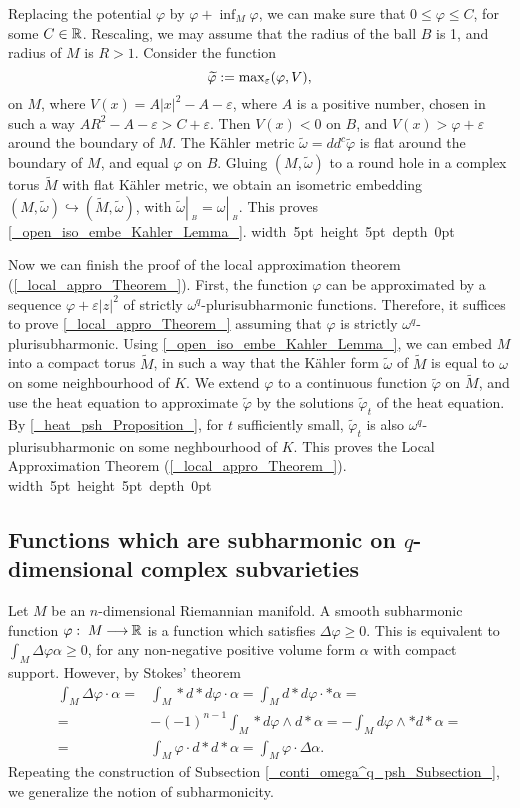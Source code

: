 \documentclass[11pt]{article}
\numberwithin{equation}{section}
\newcommand{\arrow}{{\:\longrightarrow\:}}
\newcommand{\R}{{\Bbb R}}
\newcommand{\6}{\partial}
\newcommand{\restrict}[1]{{\left|_{{\phantom{|}\!\!}_{#1}}\right.}}
\renewcommand{\tilde}{\widetilde}
\renewcommand{\phi}{\varphi}
\renewcommand{\epsilon}{\varepsilon}
\renewcommand{\geq}{\geqslant}
\renewcommand{\leq}{\leqslant}
\renewcommand{\max}{{\rm max}}
\newcounter{theorem}[section]
\def\blacksquare{\hbox{\vrule width 5pt height 5pt depth 0pt}}
\def\endproof{\blacksquare}
\begin{document}
Replacing the potential $\phi$ by $\phi + \inf_M \phi$,
we can make sure that $0 \leq \phi\leq C$, for some $C\in \R$.
Rescaling, we may assume that the radius of the ball $B$
is 1, and radius of $M$ is $R>1$. Consider the function 
\[  \tilde \phi:=
    \max_\epsilon(\phi, V),
\]
on $M$, where $V(x)= A|x|^2 - A -\epsilon$, where $A$
is a positive number, chosen in such a way
$A R^2 - A - \epsilon > C +\epsilon$. Then
$V(x)< 0$ on $B$, and $V(x)> \phi +\epsilon$ around the
boundary of $M$. The K\"ahler metric 
$\tilde\omega = dd^c \tilde \phi$ is flat 
around the boundary of $M$, and equal $\phi$ on $B$. 
Gluing $(M, \tilde \omega)$ to a round hole in a complex
torus $\tilde M$ with flat K\"ahler metric, we obtain
an isometric embedding 
$(M,\tilde \omega) \hookrightarrow (\tilde M, \tilde \omega)$,
with $\tilde \omega\restrict B = \omega\restrict B$.
This proves \ref{_open_iso_embe_Kahler_Lemma_}. \endproof

\hfill

Now we can finish the proof of the local
approximation theorem (\ref{_local_appro_Theorem_}).
First, the function $\phi$ can be approximated by a
sequence $\phi + \epsilon |z|^2$ of strictly
$\omega^q$-plurisubharmonic functions. Therefore,
it suffices to prove \ref{_local_appro_Theorem_}
assuming that $\phi$ is strictly
$\omega^q$-plurisubharmonic.
Using \ref{_open_iso_embe_Kahler_Lemma_},
we can embed $M$ into a compact torus $\tilde M$,
in such a way that the K\"ahler form $\tilde \omega$
of $\tilde M$ is equal to $\omega$ on
some neighbourhood of $K$. We extend $\phi$
to a continuous function $\tilde \phi$ 
on $\tilde M$, and use the heat equation
to approximate $\tilde \phi$ by
the solutions $\tilde \phi_t$ of the
heat equation. By \ref{_heat_psh_Proposition_}, for
$t$ sufficiently small,
$\tilde \phi_t$ is also $\omega^q$-plurisubharmonic
on some neghbourhood of $K$. This proves
the Local Approximation Theorem
(\ref{_local_appro_Theorem_}). \endproof 


\subsection{Functions which are subharmonic on
  $q$-dimensional complex subvarieties}

Let $M$ be an $n$-dimensional Riemannian manifold. A smooth subharmonic
function $\phi:\; M \arrow \R$ is a function which
satisfies $\Delta\phi \geq 0$. This is equivalent to 
$\int_M \Delta\phi \alpha\geq 0$, for any non-negative
positive volume form $\alpha$ with compact support.
However, by Stokes' theorem
\begin{align*}
\int_M \Delta\phi \cdot \alpha=&\int_M *d*d\phi \cdot
\alpha=\int_M d*d\phi \cdot *\alpha=\\ =& -(-1)^{n-1}\int_M
*d\phi \wedge d*\alpha = -\int_M d\phi \wedge *d*\alpha=\\ =& 
\int_M \phi \cdot d*d*\alpha = \int_M \phi \cdot\Delta\alpha.
\end{align*}
Repeating the construction of Subsection 
\ref{_conti_omega^q_psh_Subsection_}, we generalize the
notion of subharmonicity. 
\end{document}
